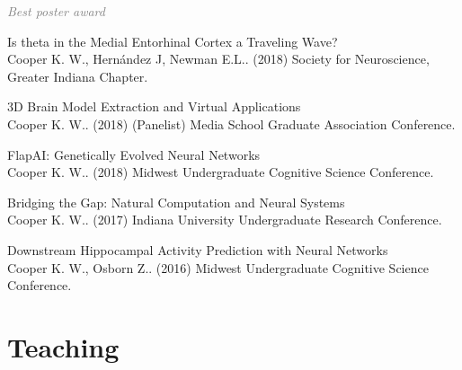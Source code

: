 \documentclass[10pt]{cooperCV2}
\begin{document}
\begin{etaremune}[itemindent=-1.5\bibhang, topsep=0pt,
				   itemsep=\bibsep,partopsep=0pt,parsep=0pt,leftmargin={\bibhang+\widthof{[999]}}]
     	\begin{innerlist}
     	
	     \item  \textcolor{grey}{\textit{Best poster award} }
     	
     	\end{innerlist}
     
	
    \item Is theta in the Medial Entorhinal Cortex a Traveling Wave?\\ Cooper K. W., Hernández J, Newman E.L.. (2018) Society for Neuroscience, Greater Indiana Chapter. 
     
	
    \item 3D Brain Model Extraction and Virtual Applications\\ Cooper K. W.. (2018) (Panelist) Media School Graduate Association Conference. 
     
	
    \item FlapAI: Genetically Evolved Neural Networks\\ Cooper K. W.. (2018) Midwest Undergraduate Cognitive Science Conference. 
     
	
    \item Bridging the Gap: Natural Computation and Neural Systems\\ Cooper K. W.. (2017) Indiana University Undergraduate Research Conference. 
     
	
    \item Downstream Hippocampal Activity Prediction with Neural Networks\\ Cooper K. W., Osborn Z.. (2016) Midwest Undergraduate Cognitive Science Conference. 
     
	


\end{etaremune}



















\section{Teaching}
\end{document}

